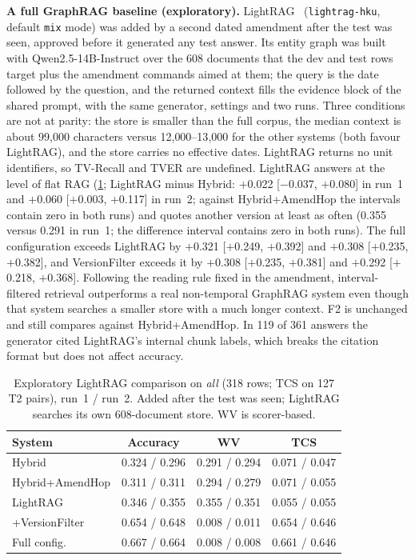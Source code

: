 \documentclass[conference]{IEEEtran}
\newcommand{\sys}[1]{\textsf{#1}}
\begin{document}
\textbf{A full GraphRAG baseline (exploratory).} LightRAG~\cite{guo2025lightrag} (\texttt{lightrag-hku}, default \texttt{mix} mode) was added by a second dated amendment after the test was seen, approved before it generated any test answer. Its entity graph was built with Qwen2.5-14B-Instruct over the 608 documents that the dev and test rows target plus the amendment commands aimed at them; the query is the date followed by the question, and the returned context fills the evidence block of the shared prompt, with the same generator, settings and two runs. Three conditions are not at parity: the store is smaller than the full corpus, the median context is about 99{,}000 characters versus 12{,}000--13{,}000 for the other systems (both favour LightRAG), and the store carries no effective dates. LightRAG returns no unit identifiers, so TV-Recall and TVER are undefined. LightRAG answers at the level of flat RAG (\cref{tab:lightrag}; LightRAG minus \sys{Hybrid}: $+$0.022 [$-$0.037, $+$0.080] in run~1 and $+$0.060 [$+$0.003, $+$0.117] in run~2; against \sys{Hybrid+AmendHop} the intervals contain zero in both runs) and quotes another version at least as often (0.355 versus 0.291 in run~1; the difference interval contains zero in both runs). The full configuration exceeds LightRAG by $+$0.321 [$+$0.249, $+$0.392] and $+$0.308 [$+$0.235, $+$0.382], and \sys{VersionFilter} exceeds it by $+$0.308 [$+$0.235, $+$0.381] and $+$0.292 [$+$0.218, $+$0.368]. Following the reading rule fixed in the amendment, interval-filtered retrieval outperforms a real non-temporal GraphRAG system even though that system searches a smaller store with a much longer context. F2 is unchanged and still compares against \sys{Hybrid+AmendHop}. In 119 of 361 answers the generator cited LightRAG's internal chunk labels, which breaks the citation format but does not affect accuracy.

\begin{table}[t]
\centering
\caption{Exploratory LightRAG comparison on \textit{all} (318 rows; TCS on 127 T2 pairs), run~1 / run~2. Added after the test was seen; LightRAG searches its own 608-document store. WV is scorer-based.}
\label{tab:lightrag}
\setlength{\tabcolsep}{3pt}
\footnotesize
\begin{tabular}{@{}l c c c@{}}
\toprule
System & Accuracy & WV & TCS \\
\midrule
Hybrid & 0.324 / 0.296 & 0.291 / 0.294 & 0.071 / 0.047 \\
Hybrid+AmendHop & 0.311 / 0.311 & 0.294 / 0.279 & 0.071 / 0.055 \\
LightRAG & 0.346 / 0.355 & 0.355 / 0.351 & 0.055 / 0.055 \\
+VersionFilter & 0.654 / 0.648 & 0.008 / 0.011 & 0.654 / 0.646 \\
Full config. & 0.667 / 0.664 & 0.008 / 0.008 & 0.661 / 0.646 \\
\bottomrule
\end{tabular}
\end{table}
\end{document}
